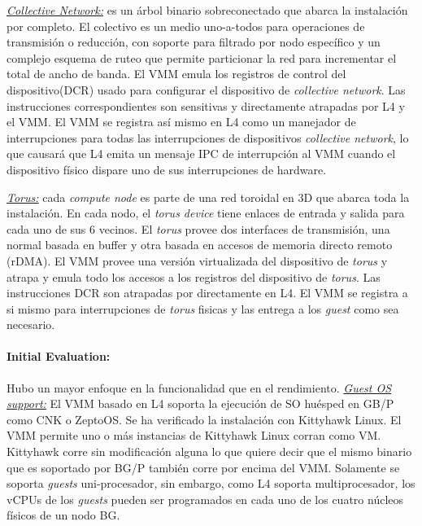 \underline{\emph{Collective Network:}} es un árbol binario sobreconectado que abarca la instalación por completo. El colectivo es un medio uno-a-todos para operaciones de  transmisión o reducción, con soporte para filtrado por nodo específico y un complejo esquema de ruteo que permite particionar la red para incrementar el total de ancho de banda. El VMM emula los registros de control del dispositivo(DCR) usado para configurar el dispositivo de \emph{collective network}. Las instrucciones correspondientes son sensitivas y directamente atrapadas por L4 y el VMM. El VMM se registra así mismo en L4 como un manejador de interrupciones para todas las interrupciones de dispositivos \emph{collective network}, lo que causará que L4 emita un mensaje IPC de interrupción al VMM cuando el dispositivo físico dispare uno de sus interrupciones de hardware. 

\underline{\emph{Torus:}} cada \emph{compute node} es parte de una red toroidal en 3D que abarca toda la instalación. En cada nodo, el \emph{torus device} tiene enlaces de entrada y salida para cada uno de sus 6 vecinos. El \emph{torus} provee dos interfaces de transmisión, una normal basada en buffer y otra basada en accesos de memoria directo remoto (rDMA). El VMM provee una versión virtualizada del dispositivo de \emph{torus} y atrapa y emula todo los accesos a los registros del dispositivo de \emph{torus}. Las instrucciones DCR son atrapadas por directamente en L4. El VMM se registra a si mismo para interrupciones de \emph{torus} fisicas y las entrega a los \emph{guest} como sea necesario.

\paragraph{\textnormal{\textbf{Initial Evaluation:}}}
Hubo un mayor enfoque en la funcionalidad que en el rendimiento. \underline{\emph{Guest OS support:}} El VMM basado en L4 soporta la ejecución de SO huésped en GB/P como CNK o ZeptoOS. Se ha verificado la instalación con Kittyhawk Linux. El VMM permite uno o más instancias de Kittyhawk Linux corran como VM. Kittyhawk corre sin modificación alguna lo que quiere decir que el mismo binario que es soportado por BG/P también corre por encima del VMM. Solamente se soporta \emph{guests} uni-procesador, sin embargo, como L4 soporta multiprocesador, los vCPUs de los \emph{guests} pueden ser programados en cada uno de los cuatro núcleos físicos de un nodo BG. 


